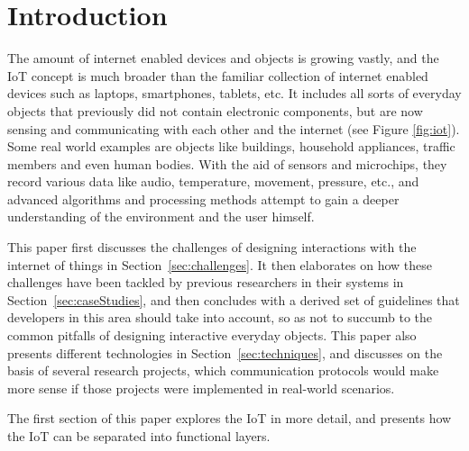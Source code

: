 


\section{Introduction}
\label{sec:introduction}

The amount of internet enabled devices and objects is growing vastly, and the IoT concept is much broader than the familiar collection of internet enabled devices such as laptops, smartphones, tablets, etc.
It includes all sorts of everyday objects that previously did not contain electronic components, but are now sensing and communicating with each other and the internet (see Figure \ref{fig:iot}). Some real world examples are objects like buildings, household appliances, traffic members and even human bodies.
With the aid of sensors and microchips, they record various data like audio, temperature, movement, pressure, etc., and advanced algorithms and processing methods attempt to gain a deeper understanding of the environment and the user himself.

This paper first discusses the challenges of designing interactions with the internet of things in Section~\ref{sec:challenges}. 
It then elaborates on how these challenges have been tackled by previous researchers in their systems in Section~\ref{sec:caseStudies}, and then concludes with a derived set of guidelines that developers in this area should take into account, so as not to succumb to the common pitfalls of designing interactive everyday objects.
This paper also presents different technologies in Section~\ref{sec:techniques}, and discusses on the basis of several research projects, which communication protocols would make more sense if those projects were implemented in real-world scenarios.

The first section of this paper explores the IoT in more detail, and presents how the IoT can be separated into functional layers.

